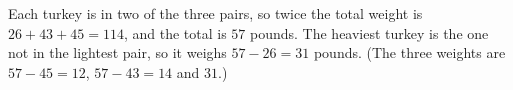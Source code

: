 Each turkey is in two of the three pairs, so twice the total weight is $26+43+45=114$, and the total is $57$ pounds. The heaviest turkey is the one not in the lightest pair, so it weighs $57-26=\boxed{31}$ pounds. (The three weights are $57-45=12$, $57-43=14$ and $31$.)
